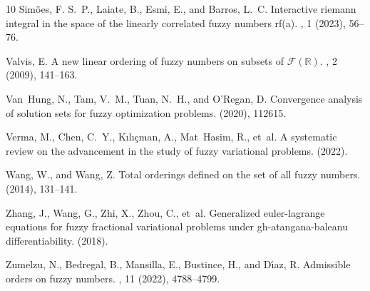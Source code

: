 \documentclass[12pt,a4paper]{article}
\begin{document}
\begin{thebibliography}{10}
{\sc Sim{\~o}es, F. S.~P., Laiate, B., Esmi, E., and Barros, L.~C.}
\newblock Interactive riemann integral in the space of the linearly correlated fuzzy numbers rf(a).
, 1 (2023), 56--76.

{\sc Valvis, E.}
\newblock A new linear ordering of fuzzy numbers on subsets of $\mathcal{F}(\mathbb{R})$.
, 2 (2009), 141--163.

{\sc Van~Hung, N., Tam, V.~M., Tuan, N.~H., and O’Regan, D.}
\newblock Convergence analysis of solution sets for fuzzy optimization problems.
 (2020), 112615.

{\sc Verma, M., Chen, C.~Y., K{\i}l{\i}{\c{c}}man, A., Mat~Hasim, R., et~al.}
\newblock A systematic review on the advancement in the study of fuzzy variational problems.
 (2022).

{\sc Wang, W., and Wang, Z.}
\newblock Total orderings defined on the set of all fuzzy numbers.
 (2014), 131--141.

{\sc Zhang, J., Wang, G., Zhi, X., Zhou, C., et~al.}
\newblock Generalized euler-lagrange equations for fuzzy fractional variational problems under gh-atangana-baleanu differentiability.
 (2018).

{\sc Zumelzu, N., Bedregal, B., Mansilla, E., Bustince, H., and D{\'\i}az, R.}
\newblock Admissible orders on fuzzy numbers.
, 11 (2022), 4788--4799.

\end{thebibliography}
\end{document}
